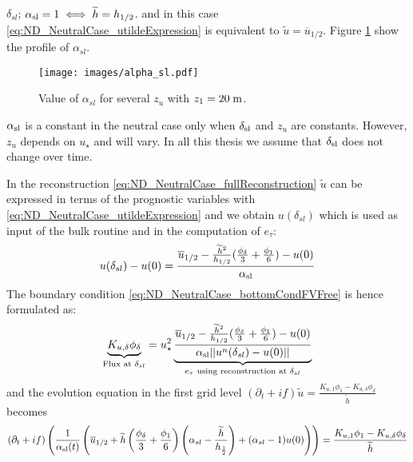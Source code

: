 $\delta_{sl}$; $\alpha_{\rm sl} = 1 \iff \widetilde{h}=h_{1/2}$.
and in this case \eqref{eq:ND_NeutralCase_utildeExpression} is
equivalent to $\widetilde{u} = \overline{u}_{1/2}$.
Figure \ref{fig:ND_NeutralCase_alpha_sl} show the
profile of $\alpha_{sl}$.
\begin{figure}
	\centering
	\texttt{[image: images/alpha\_sl.pdf]}
	\caption
	{ Value of $\alpha_{sl}$
	for several $z_u$ with $z_1=20\;{\rm m}$.
	}
	\label{fig:ND_NeutralCase_alpha_sl}
\end{figure}
\begin{remark}
$\alpha_{\rm sl}$ is a constant in the neutral case
only when $\delta_{\rm sl}$ and $z_{u}$ are constants. However,
$z_{u}$ depends on $u_\star$ and will vary.
In all this thesis we assume that $\delta_{\rm sl}$ does not
change over time.
\end{remark}
%
In the reconstruction \eqref{eq:ND_NeutralCase_fullReconstruction}
$\widetilde{u}$ can be expressed in terms of the prognostic
variables with \eqref{eq:ND_NeutralCase_utildeExpression}
and we obtain $u(\delta_{sl})$ which is used as input
of the bulk routine and in the computation of $e_\tau$:
\begin{equation}
u(\delta_{sl})-u(0)=\frac{\overline{u}_{1/2} -
	\frac{\widetilde{h}^2}{h_{1/2}}
	(\frac{\phi_{\delta}}{3} + \frac{\phi_1}{6}) - u(0)}
	{\alpha_{\rm sl}}
\end{equation}
The boundary condition \eqref{eq:ND_NeutralCase_bottomCondFVFree}
is hence formulated as:
\begin{equation}
	\label{eq:ND_NeutralCase_boundaryCondFVfree}
	\underbrace{K_{u,\delta} \phi_{\delta}}_{
		\text{Flux at } \delta_{sl}
	} = u_\star^2
	\underbrace{\frac{\overline{u}_{1/2} -
	\frac{\widetilde{h}^2}{h_{1/2}}
	(\frac{\phi_{\delta}}{3} + \frac{\phi_1}{6})-u(0)}
	{\alpha_{\rm sl}||u^n(\delta_{sl}) - u(0)||}}_{
		e_\tau \text{ using reconstruction at } \delta_{sl}
	}
\end{equation}
and the evolution equation in the first grid level
$ (\partial_t+if) \widetilde{u}
= \frac{K_{u, 1}\phi_1 - K_{u,\delta} \phi_{\delta}}{\widetilde{h}}$
becomes
\begin{equation}
	\label{eq:ND_NeutralCase_semiDiscreteEkmanEqFVfree}
	(\partial_t+if) \left(\frac{1}{\alpha_{\rm sl}(t)}
	\left(\overline{u}_{1/2} + \widetilde{h}
	\left(\frac{\phi_{\delta}}{3} + \frac{\phi_1}{6}\right)
	\left(\alpha_{sl} - \frac{\widetilde{h}}{h_{\frac{1}{2}}}\right)
	+ (\alpha_{sl} - 1) u(0)
	\right)\right)
	= \frac{K_{u, 1}\phi_1 - K_{u,\delta} \phi_{\delta}}{\widetilde{h}}
\end{equation}

